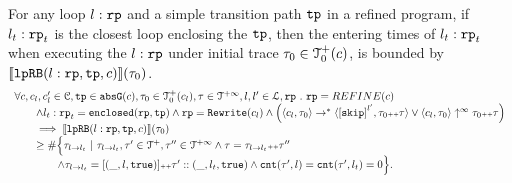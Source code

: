 
\begin{lemma}
  \label{lemma:looprb-sound}
  For any loop $l: \mathtt{rp}$ and a simple transition path $\mathtt{tp}$ in a refined program, if $l_t: \mathtt{rp}_t$ is the closest loop enclosing the $\mathtt{tp}$, then the entering times of $l_t: \mathtt{rp}_t$ when executing the $l: \mathtt{rp}$ under initial trace $\mathtt{\tau}_0 \in \mathcal{T}^{+}_0(c)$, is bounded by $\llbracket \mathtt{lpRB}(l: \mathtt{rp}, \mathtt{tp}, c) \rrbracket(\mathtt{\tau}_0)$.
  \[
    \begin{array}{l}
    \forall c, c_l, c_l' \in \cdom, \tpath \in \absG(c), \trace_0 \in \ftdom_0(c_l), \trace \in \tdom, l, l' \in \ldom, \rprog \st 
    \rprog = REFINE(c)
    \\ \qquad
    \land l_t: \rprog_t = \kw{enclosed}(\rprog, \tpath)
    \land 
    \rprog = \algrewrite(c_l)
    \land
    \Big(
    \config{c_l, \trace_0} \to^* \config{\clabel{\eskip}^{l'}, \trace_0 \tracecat \trace}
    \lor \config{c_l, \trace_0} \uparrow^{\infty} \trace_0 \tracecat \trace 
    \Big)
    \\ \qquad
    \implies
    \econfig{\lpchB(l: \rprog, \tpath, c)}(\trace_0) 
    \\ \qquad \geq 
    \# \Big\{\trace_{l \to l_t} ~\vert~ \trace_{l \to l_t}, \trace' \in \ftdom, \trace'' \in \tdom
    \land \trace = \trace_{l \to l_t} \tracecat \trace''
    \\ \qquad \qquad
    \land \trace_{l \to l_t} = [(\_, l, \etrue)] \tracecat \trace' :: (\_, l_t, \etrue)
    \land \counter(\trace', l) = \counter(\trace', l_t) = 0 
    \Big\}.
    \end{array}
  \]
  \end{lemma}

